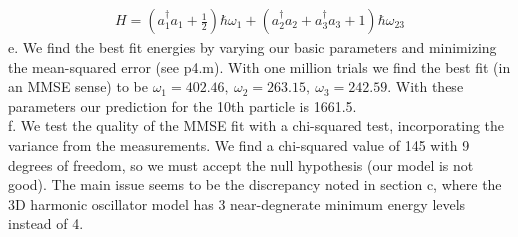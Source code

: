 \documentclass[a4paper,12pt]{article}
\numberwithin{equation}{section}
\begin{document}
\begin{gather}
 H=(a_1^\dagger a_1+\frac{1}{2})\hbar \omega_1+(a_2^\dagger a_2+a_3^\dagger a_3 + 1)\hbar \omega_{23}
\end{gather}
e. We find the best fit energies by varying our basic parameters and minimizing the mean-squared error (see p4.m).
With one million trials we find the best fit (in an MMSE sense) to be $\omega_1=402.46,\ \omega_2=263.15,\ \omega_3=242.59$.
With these parameters our prediction for the 10th particle is 1661.5.\\
f. We test the quality of the MMSE fit with a chi-squared test, incorporating the variance from the measurements.
We find a chi-squared value of 145 with 9 degrees of freedom, so we must accept the null hypothesis (our model is not good). 
The main issue seems to be the discrepancy noted in section c, where the 3D harmonic oscillator model has 3 near-degnerate minimum energy levels instead of 4.
\end{document}

